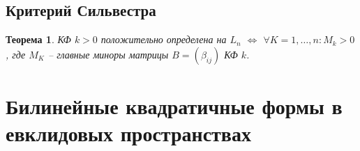 \documentclass[a4paper,12pt]{article}
\newtheorem{theorem}{Теорема}[section]
\begin{document}
\subsection{Критерий Сильвестра}

\begin{theorem}
	КФ $k > 0$ положительно определена на $L_n$ $\Leftrightarrow$ $\forall K = 1,\ldots,n: M_k > 0$, где $M_K$ -- главные миноры матрицы $B = (\beta_{ij})$ КФ $k$.
\end{theorem}

\section{Билинейные квадратичные формы в евклидовых пространствах}
\end{document}
